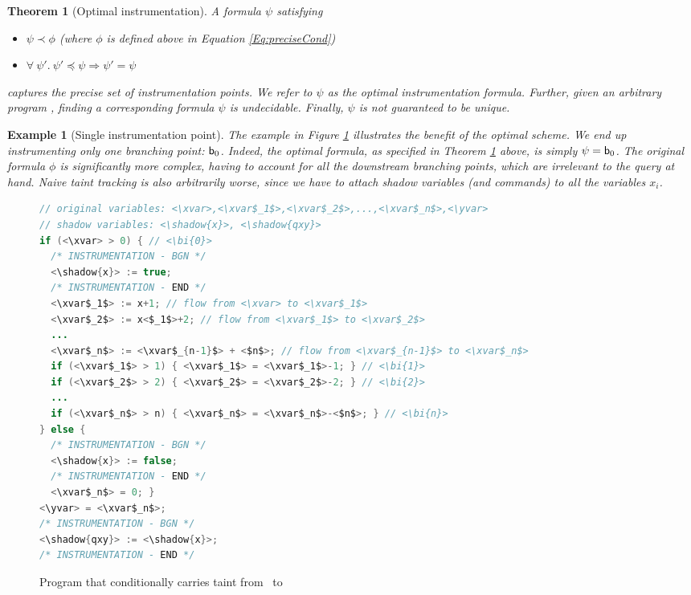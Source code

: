 \documentclass[]{article}
\newtheorem{thm}{Theorem}
\newtheorem{ex}{Example}
\begin{document}
\begin{thm}[Optimal instrumentation]\label{Th:optimal} A formula $\psi$ satisfying
	\begin{itemize}
		\item $\psi \prec \phi$ (where $\phi$ is defined above in Equation \ref{Eq:preciseCond})
		\item $\forall\ \psi'.\ \psi' \preceq \psi \Rightarrow \psi' = \psi$
	\end{itemize}
	captures the precise set of instrumentation points. We refer to $\psi$ as the \emph{optimal instrumentation formula}. Further, given an arbitrary program \prog, finding a corresponding formula $\psi$ is undecidable. Finally, $\psi$ is not guaranteed to be unique.
\end{thm}

\newcommand{\bi}[1]{\textnormal{${\sf b}_{#1}$}}

\begin{ex}[Single instrumentation point] The example in Figure \ref{Fi:example} illustrates the benefit of the optimal scheme. We end up instrumenting only one branching point: \bi{0}. Indeed, the optimal formula, as specified in Theorem \ref{Th:optimal} above, is simply $\psi = \bi{0}$. The original formula $\phi$ is significantly more complex, having to account for all the downstream branching points, which are irrelevant to the query at hand. Naive taint tracking is also arbitrarily worse, since we have to attach shadow variables (and commands) to all the variables $x_i$.
\end{ex}

\begin{figure}
\begin{lstlisting}[language=Java,escapeinside={<>}]
// original variables: <\xvar>,<\xvar$_1$>,<\xvar$_2$>,...,<\xvar$_n$>,<\yvar>
// shadow variables: <\shadow{x}>, <\shadow{qxy}>
if (<\xvar> > 0) { // <\bi{0}>
  /* INSTRUMENTATION - BGN */
  <\shadow{x}> := true;
  /* INSTRUMENTATION - END */
  <\xvar$_1$> := x+1; // flow from <\xvar> to <\xvar$_1$>
  <\xvar$_2$> := x<$_1$>+2; // flow from <\xvar$_1$> to <\xvar$_2$>
  ...
  <\xvar$_n$> := <\xvar$_{n-1}$> + <$n$>; // flow from <\xvar$_{n-1}$> to <\xvar$_n$> 
  if (<\xvar$_1$> > 1) { <\xvar$_1$> = <\xvar$_1$>-1; } // <\bi{1}>
  if (<\xvar$_2$> > 2) { <\xvar$_2$> = <\xvar$_2$>-2; } // <\bi{2}>
  ...
  if (<\xvar$_n$> > n) { <\xvar$_n$> = <\xvar$_n$>-<$n$>; } // <\bi{n}>       
} else {
  /* INSTRUMENTATION - BGN */
  <\shadow{x}> := false;
  /* INSTRUMENTATION - END */
  <\xvar$_n$> = 0; }
<\yvar> = <\xvar$_n$>;
/* INSTRUMENTATION - BGN */
<\shadow{qxy}> := <\shadow{x}>;
/* INSTRUMENTATION - END */
\end{lstlisting}
\caption{\label{Fi:example}Program that conditionally carries taint from \xvar\ to \yvar}
\end{figure}
\end{document}
